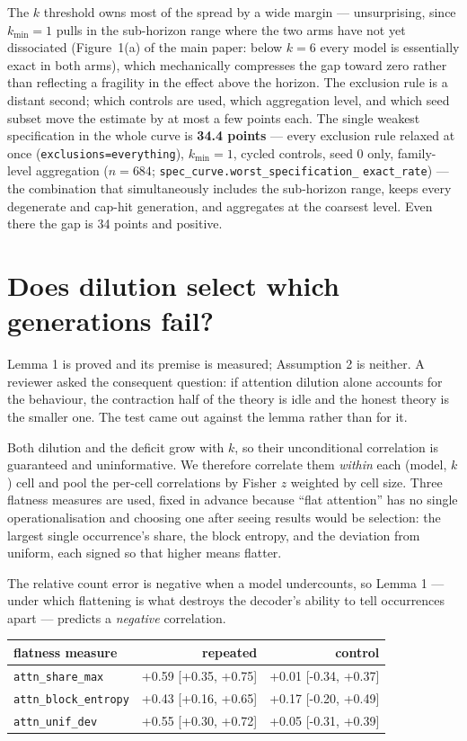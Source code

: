 \documentclass[11pt]{article}
\begin{document}
The $k$ threshold owns most of the spread by a wide margin --- unsurprising,
since $k_{\min}=1$ pulls in the sub-horizon range where the two arms have not
yet dissociated (Figure~1(a) of the main paper: below $k=6$ every
model is essentially exact in both arms), which mechanically compresses the
gap toward zero rather than reflecting a fragility in the effect above the
horizon. The exclusion rule is a distant second; which controls are used,
which aggregation level, and which seed subset move the estimate by at most a
few points each. The single weakest specification in the whole curve is
\textbf{34.4 points} --- every exclusion rule relaxed at once
(\texttt{exclusions=everything}), $k_{\min}=1$, cycled controls, seed 0 only,
family-level aggregation ($n=684$; \texttt{spec\_curve.worst\_specification\_}
\texttt{exact\_rate}) --- the combination that simultaneously includes the
sub-horizon range, keeps every degenerate and cap-hit generation, and
aggregates at the coarsest level. Even there the gap is 34 points and positive.

\section{Does dilution select which generations fail?}
\label{sec:s12}

Lemma 1 is proved and its premise is measured; Assumption 2 is neither. A
reviewer asked the consequent question: if attention dilution alone accounts for
the behaviour, the contraction half of the theory is idle and the honest theory
is the smaller one. The test came out against the lemma rather than for it.

Both dilution and the deficit grow with $k$, so their unconditional correlation
is guaranteed and uninformative. We therefore correlate them \emph{within} each
(model, $k$) cell and pool the per-cell correlations by Fisher $z$ weighted by
cell size. Three flatness measures are used, fixed in advance because ``flat
attention'' has no single operationalisation and choosing one after seeing
results would be selection: the largest single occurrence's share, the block
entropy, and the deviation from uniform, each signed so that higher means
flatter.

The relative count error is negative when a model undercounts, so Lemma 1 ---
under which flattening is what destroys the decoder's ability to tell occurrences
apart --- predicts a \emph{negative} correlation.

\begin{center}
\begin{tabular}{lrr}
\toprule
flatness measure & repeated & control \\
\midrule
\texttt{attn\_share\_max} & +0.59 [+0.35, +0.75] & +0.01 [-0.34, +0.37] \\
\texttt{attn\_block\_entropy} & +0.43 [+0.16, +0.65] & +0.17 [-0.20, +0.49] \\
\texttt{attn\_unif\_dev} & +0.55 [+0.30, +0.72] & +0.05 [-0.31, +0.39] \\
\bottomrule
\end{tabular}
\end{center}
\end{document}
